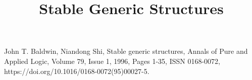 \documentclass[a4paper]{article}
\title{Stable Generic Structures}
\date{}
\begin{document}
\maketitle
\par{John T. Baldwin, Niandong Shi, Stable generic structures, Annals of Pure and Applied Logic, Volume 79, Issue 1, 1996, Pages 1-35, ISSN 0168-0072, https://doi.org/10.1016/0168-0072(95)00027-5.}
\printbibliography
\end{document}
